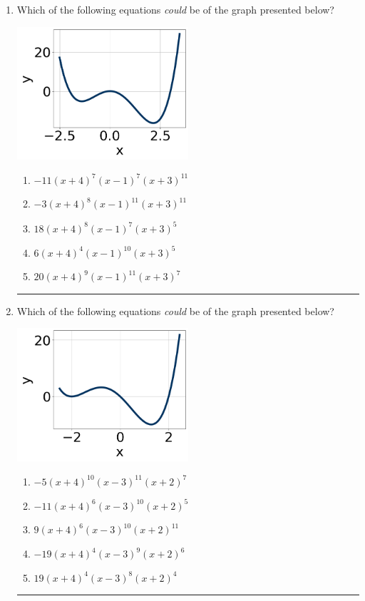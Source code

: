 \documentclass[14pt]{extbook}
\newcommand{\litem}[1]{\item#1\hspace*{-1cm}\rule{\textwidth}{0.4pt}}
\begin{document}
\begin{enumerate}
{\begin{enumerate}[label=\Alph*.]
\end{enumerate} }
\litem{
Which of the following equations \textit{could} be of the graph presented below?
\begin{center}
    \includegraphics[width=0.5\textwidth]{../Figures/polyGraphToFunctionCopyA.png}
\end{center}
\begin{enumerate}[label=\Alph*.]
\item \( -11(x + 4)^{7} (x - 1)^{7} (x + 3)^{11} \)
\item \( -3(x + 4)^{8} (x - 1)^{11} (x + 3)^{11} \)
\item \( 18(x + 4)^{8} (x - 1)^{7} (x + 3)^{5} \)
\item \( 6(x + 4)^{4} (x - 1)^{10} (x + 3)^{5} \)
\item \( 20(x + 4)^{9} (x - 1)^{11} (x + 3)^{7} \)

\end{enumerate} }
\litem{
Which of the following equations \textit{could} be of the graph presented below?
\begin{center}
    \includegraphics[width=0.5\textwidth]{../Figures/polyGraphToFunctionA.png}
\end{center}
\begin{enumerate}[label=\Alph*.]
\item \( -5(x + 4)^{10} (x - 3)^{11} (x + 2)^{7} \)
\item \( -11(x + 4)^{6} (x - 3)^{10} (x + 2)^{5} \)
\item \( 9(x + 4)^{6} (x - 3)^{10} (x + 2)^{11} \)
\item \( -19(x + 4)^{4} (x - 3)^{9} (x + 2)^{6} \)
\item \( 19(x + 4)^{4} (x - 3)^{8} (x + 2)^{4} \)


\end{enumerate}}
\end{enumerate}
\end{document}

